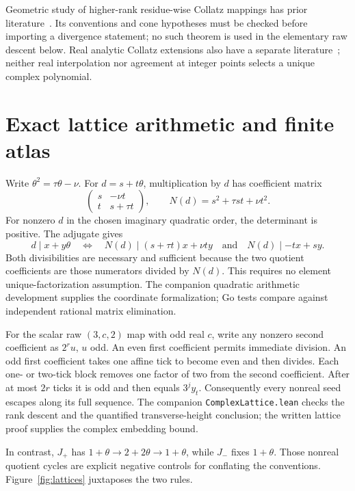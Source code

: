 \documentclass[11pt,letterpaper]{article}
\begin{document}
Geometric study of higher-rank residue-wise Collatz mappings has prior literature~\cite{Kionke17}. Its conventions and cone hypotheses must be checked before importing a divergence statement; no such theorem is used in the elementary raw descent below. Real analytic Collatz extensions also have a separate literature~\cite{Chamberland96}; neither real interpolation nor agreement at integer points selects a unique complex polynomial.

\section{Exact lattice arithmetic and finite atlas}

Write \(\theta^2=\tau\theta-\nu\). For \(d=s+t\theta\), multiplication by \(d\) has coefficient matrix
\[
\begin{pmatrix}s&-\nu t\\t&s+\tau t\end{pmatrix},
\qquad N(d)=s^2+\tau st+\nu t^2.
\]
For nonzero \(d\) in the chosen imaginary quadratic order, the determinant is positive. The adjugate gives
\[
d\mid x+y\theta
\quad\Longleftrightarrow\quad
N(d)\mid(s+\tau t)x+\nu ty
\quad\text{and}\quad N(d)\mid-tx+sy.
\]
Both divisibilities are necessary and sufficient because the two quotient coefficients are those numerators divided by \(N(d)\). This requires no element unique-factorization assumption. The companion quadratic arithmetic development supplies the coordinate formalization; Go tests compare against independent rational matrix elimination.

For the scalar raw \((3,c,2)\) map with odd real \(c\), write any nonzero second coefficient as \(2^r u\), \(u\) odd. An even first coefficient permits immediate division. An odd first coefficient takes one affine tick to become even and then divides. Each one- or two-tick block removes one factor of two from the second coefficient. After at most \(2r\) ticks it is odd and then equals \(3^j y_t\). Consequently every nonreal seed escapes along its full sequence. The companion \texttt{ComplexLattice.lean} checks the rank descent and the quantified transverse-height conclusion; the written lattice proof supplies the complex embedding bound.

In contrast, \(J_+\) has \(1+\theta\to2+2\theta\to1+\theta\), while \(J_-\) fixes \(1+\theta\). Those nonreal quotient cycles are explicit negative controls for conflating the conventions. Figure~\ref{fig:lattices} juxtaposes the two rules.
\end{document}
